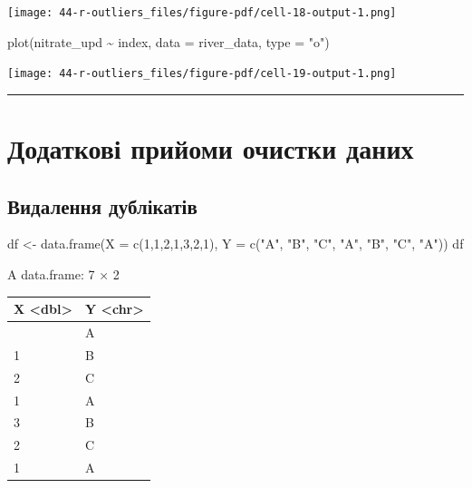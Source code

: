 \documentclass[
  letterpaper,
  DIV=11,
  numbers=noendperiod]{scrreprt}
\newenvironment{Shaded}{\begin{snugshade}}{\end{snugshade}}
\newcommand{\AttributeTok}[1]{\textcolor[rgb]{0.40,0.45,0.13}{#1}}
\newcommand{\DecValTok}[1]{\textcolor[rgb]{0.68,0.00,0.00}{#1}}
\newcommand{\FunctionTok}[1]{\textcolor[rgb]{0.28,0.35,0.67}{#1}}
\newcommand{\NormalTok}[1]{\textcolor[rgb]{0.00,0.23,0.31}{#1}}
\newcommand{\OtherTok}[1]{\textcolor[rgb]{0.00,0.23,0.31}{#1}}
\newcommand{\SpecialCharTok}[1]{\textcolor[rgb]{0.37,0.37,0.37}{#1}}
\newcommand{\StringTok}[1]{\textcolor[rgb]{0.13,0.47,0.30}{#1}}
\begin{document}
\texttt{[image: 44-r-outliers\_files/figure-pdf/cell-18-output-1.png]}

\begin{Shaded}
\begin{Highlighting}[]
\FunctionTok{plot}\NormalTok{(nitrate\_upd }\SpecialCharTok{\textasciitilde{}}\NormalTok{ index, }\AttributeTok{data =}\NormalTok{ river\_data, }\AttributeTok{type =} \StringTok{"o"}\NormalTok{)}
\end{Highlighting}
\end{Shaded}

\texttt{[image: 44-r-outliers\_files/figure-pdf/cell-19-output-1.png]}

\begin{center}\rule{0.5\linewidth}{0.5pt}\end{center}

\section{\texorpdfstring{Додаткові прийоми очистки даних
}{Додаткові прийоми очистки даних }}\label{ux434ux43eux434ux430ux442ux43aux43eux432ux456-ux43fux440ux438ux439ux43eux43cux438-ux43eux447ux438ux441ux442ux43aux438-ux434ux430ux43dux438ux445}

\subsection{Видалення
дублікатів}\label{ux432ux438ux434ux430ux43bux435ux43dux43dux44f-ux434ux443ux431ux43bux456ux43aux430ux442ux456ux432}

\begin{Shaded}
\begin{Highlighting}[]
\NormalTok{df }\OtherTok{\textless{}{-}} \FunctionTok{data.frame}\NormalTok{(}\AttributeTok{X =} \FunctionTok{c}\NormalTok{(}\DecValTok{1}\NormalTok{,}\DecValTok{1}\NormalTok{,}\DecValTok{2}\NormalTok{,}\DecValTok{1}\NormalTok{,}\DecValTok{3}\NormalTok{,}\DecValTok{2}\NormalTok{,}\DecValTok{1}\NormalTok{), }\AttributeTok{Y =} \FunctionTok{c}\NormalTok{(}\StringTok{"A"}\NormalTok{, }\StringTok{"B"}\NormalTok{, }\StringTok{"C"}\NormalTok{, }\StringTok{"A"}\NormalTok{, }\StringTok{"B"}\NormalTok{, }\StringTok{"C"}\NormalTok{, }\StringTok{"A"}\NormalTok{))}
\NormalTok{df}
\end{Highlighting}
\end{Shaded}

A data.frame: 7 × 2

\begin{longtable}[]{@{}ll@{}}
\toprule\noalign{}
X \textless dbl\textgreater{} & Y \textless chr\textgreater{} \\
\midrule\noalign{}
\endhead
\bottomrule\noalign{}
\endlastfoot
1 & A \\
1 & B \\
2 & C \\
1 & A \\
3 & B \\
2 & C \\
1 & A \\
\end{longtable}
\end{document}
